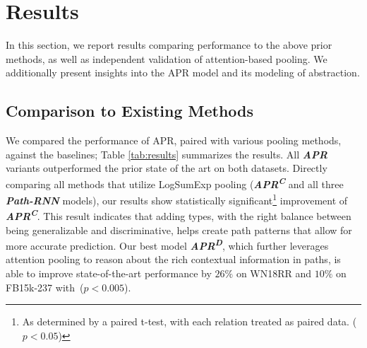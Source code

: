 \documentclass[letterpaper]{article} %
\newenvironment{flushitemize}{%
\begin{list}{$\bullet$}
   {\setlength{\leftmargin}{15pt}}%
    \setlength{\labelwidth}{20pt}
    \setlength{\itemindent}{0pt}
    \setlength{\labelsep}{0.5em}
 \setlength{\itemsep}{1pt}
 \setlength{\parskip}{0pt} 
 \setlength{\parsep}{0pt}}
 {\end{list}}
\begin{document}
    





\section{Results}
In this section, we report results comparing performance to the above prior methods, as well as independent validation of attention-based pooling.  We additionally present insights into the APR model and its modeling of abstraction.

\subsection{Comparison to Existing Methods}
We compared the performance of APR, paired with various pooling methods, against the baselines; Table \ref{tab:results} summarizes the results. All \textit{\textbf{APR}} variants outperformed the prior state of the art on both datasets. Directly comparing all methods that utilize LogSumExp pooling (\textit{\textbf{APR\textsuperscript{C}}} and all three \textit{\textbf{Path-RNN}} models), our results show statistically significant\footnote{As determined by a paired t-test, with each relation treated as paired data. ($p<0.05$)} improvement of \textit{\textbf{APR\textsuperscript{C}}}.  This result indicates that adding types, with the right balance between being generalizable and discriminative, helps create path patterns that allow for more accurate prediction. Our best model \textit{\textbf{APR\textsuperscript{D}}}, which further leverages attention pooling to reason about the rich contextual information in paths, is able to improve state-of-the-art performance by $26\%$ on WN18RR and $10\%$ on FB15k-237 with~($p<0.005$).
\end{document}
